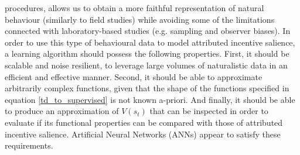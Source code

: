 procedures, allows us to obtain a more faithful representation of natural behaviour (similarly to field studies) while avoiding some of the limitations connected with laboratory-based studies (e.g. sampling and observer biases).
\newline
\newline
In order to use this type of behavioural data to model attributed incentive salience, a learning algorithm should possess the following properties. First, it should be scalable and noise resilient, to leverage large volumes of naturalistic data in an efficient and effective manner. Second, it should be able to approximate arbitrarily complex functions, given that the shape of the functions specified in equation \ref{td_to_supervised} is not known a-priori. And finally, it should be able to produce an approximation of $V(s_{t})$ that can be inspected in order to evaluate if its functional properties can be compared with those of attributed incentive salience. Artificial Neural Networks (ANNs) appear to satisfy these requirements.

